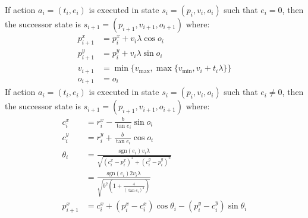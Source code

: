 \documentclass[10pt]{article}
\theoremstyle{plain}
\begin{document}
If action $a_{i} = (t_{i}, e_{i})$ is executed in state $s_{i} = (p_{i}, v_{i}, o_{i})$ such that $e_{i} = 0$, then the successor state is $s_{i+1} = (p_{i+1}, v_{i+1}, o_{i+1})$ where:
\begin{align}
    p_{i+1}^{x} & = p_{i}^{x} + v_{i} \lambda \cos{o_{i}} \\
    p_{i+1}^{y} & = p_{i}^{y} + v_{i} \lambda \sin{o_{i}} \\
    v_{i+1} & = \min\{ v_{\max}, \max\{ v_{\min}, v_{i} + t_{i} \lambda \} \} \\
    o_{i+1} & = o_{i}
\end{align}
If action $a_{i} = (t_{i}, e_{i})$ is executed in state $s_{i} = (p_{i}, v_{i}, o_{i})$ such that $e_{i} \ne 0$, then the successor state is $s_{i+1} = (p_{i+1}, v_{i+1}, o_{i+1})$ where:
\begin{align}
    c_{i}^{x} & = r_{i}^{x} - \frac{b}{\tan{e_{i}}} \sin{o_{i}} \\
    c_{i}^{y} & = r_{i}^{y} + \frac{b}{\tan{e_{i}}} \cos{o_{i}} \\
    \theta_{i} & = \frac{ \text{sgn}(e_{i}) v_{i} \lambda}{\sqrt{(c_{i}^{x} - p_{i}^{x})^{2} + (c_{i}^{y} - p_{i}^{y})^{2}}} \\
    & = \frac{\text{sgn}(e_{i}) 2 v_{i} \lambda}{\sqrt{b^{2} \left( 1 + \frac{4}{(\tan{e_{i}})^{2}} \right)}} \\
    p_{i+1}^{x} & = c_{i}^{x} + (p_{i}^{x} - c_{i}^{x}) \cos{\theta_{i}} - (p_{i}^{y} - c_{i}^{y}) \sin{\theta_{i}} \\

\end{align}
\end{document}
